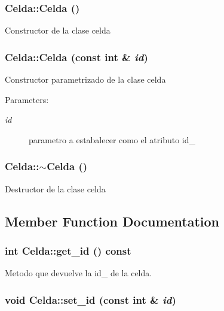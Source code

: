 \subsubsection{\setlength{\rightskip}{0pt plus 5cm}Celda::Celda ()}\label{classCelda_255f613383c5100f88c59a402b4b4ac9}


Constructor de la clase celda 
\subsubsection{\setlength{\rightskip}{0pt plus 5cm}Celda::Celda (const int \& {\em id})}\label{classCelda_418d48636d6a5007dee995d06db42d1a}


Constructor parametrizado de la clase celda \begin{Desc}
\item[Parameters:]
\begin{description}
\item[{\em id}]parametro a estabalecer como el atributo id\_\- \end{description}
\end{Desc}
\subsubsection{\setlength{\rightskip}{0pt plus 5cm}Celda::$\sim$Celda ()}\label{classCelda_4991502c5cab11878ab563b4ec819d34}


Destructor de la clase celda 

\subsection{Member Function Documentation}
\subsubsection{\setlength{\rightskip}{0pt plus 5cm}int Celda::get\_\-id () const\hspace{0.3cm}{\tt  [inline]}}\label{classCelda_9ebf77f2c605693c10cb670d275f2399}


Metodo que devuelve la id\_\- de la celda. 

\subsubsection{\setlength{\rightskip}{0pt plus 5cm}void Celda::set\_\-id (const int \& {\em id})}\label{classCelda_4282078fa5f3cce5e8efca91e29e622f}


